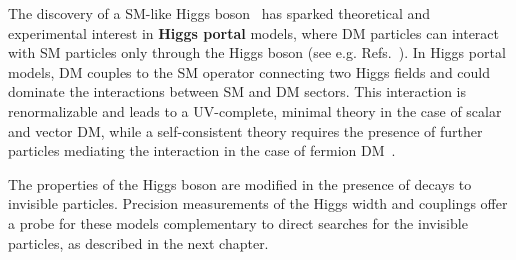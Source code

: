The discovery of a SM-like Higgs boson~\cite{Aad:2012tfa,Chatrchyan:2012xdj} has sparked theoretical and experimental interest in \textbf{Higgs portal} models, where DM particles can interact with SM particles only through the Higgs boson (see e.g. Refs.~\cite{Patt:2006fw,Englert:2011yb,Djouadi:2011aa}). In Higgs portal models, DM couples to the SM operator connecting two Higgs fields and could dominate the interactions between SM and DM sectors.
This interaction is renormalizable and leads to a UV-complete, minimal theory in the case of scalar and vector DM, while a self-consistent theory requires the presence of further particles mediating the interaction in the case of fermion DM~\cite{Freitas:2015hsa,Escudero:2016gzx,deSimone:2014pda}. %





The properties of the Higgs boson are modified in the presence of decays to invisible particles. Precision measurements of the Higgs width and couplings offer a probe for these models complementary to direct searches for the invisible particles, as described in the next chapter. 

